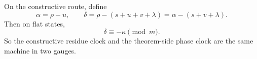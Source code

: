 \begin{remark}
On the constructive route, define
\[
\alpha=\rho-u,
\qquad
\delta=\rho-(s+u+v+\lambda)=\alpha-(s+v+\lambda).
\]
Then on flat states,
\[
\delta\equiv -\kappa \pmod m.
\]
So the constructive residue clock and the theorem-side phase clock are the same machine in two gauges.
\end{remark}
